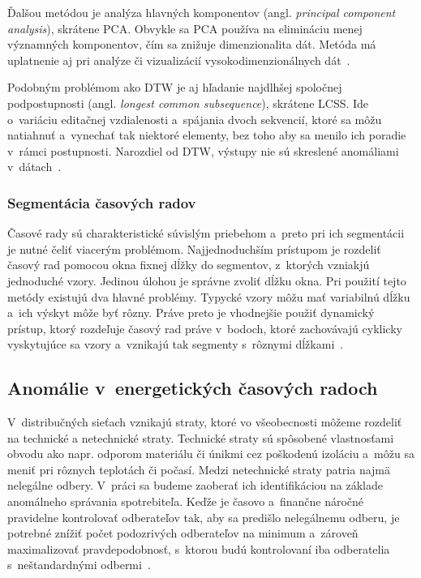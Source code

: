 \documentclass[a4paper,twoside,slovak,12pt,appendix]{article}
\begin{document}
Ďalšou metódou je analýza hlavných komponentov (angl. \textit{principal
component analysis}), skrátene PCA. Obvykle sa PCA používa na elimináciu menej
významných komponentov, čím sa znižuje dimenzionalita dát. Metóda má uplatnenie
aj pri analýze či vizualizácií vysokodimenzionálnych dát~\cite{Fu2011}.

Podobným problémom ako DTW je aj hľadanie najdlhšej spoločnej podpostupnosti
(angl. \textit{longest common subsequence}), skrátene LCSS. Ide o~variáciu
editačnej vzdialenosti a~spájania dvoch sekvencií, ktoré sa môžu natiahnuť
a~vynechať tak niektoré elementy, bez toho aby sa menilo ich poradie v~rámci
postupnosti. Narozdiel od DTW, výstupy nie sú skreslené anomáliami
v~dátach~\cite{Fu2011}.

\subsubsection{Segmentácia časových radov}
Časové rady sú charakteristické súvislým priebehom a~preto pri ich segmentácii
je nutné čeliť viacerým problémom. Najjednoduchším prístupom je rozdeliť časový
rad pomocou okna fixnej dĺžky do segmentov, z~ktorých vzniakjú jednoduché vzory.
Jedinou úlohou je správne zvoliť dĺžku okna. Pri použití tejto metódy existujú
dva hlavné problémy. Typycké vzory môžu mať variabilnú dĺžku a~ich výskyt môže
byť rôzny. Práve preto je vhodnejšie použiť dynamický prístup, ktorý rozdeľuje
časový rad práve v~bodoch, ktoré zachovávajú cyklicky vyskytujúce sa vzory
a~vznikajú tak segmenty s~rôznymi dĺžkami~\cite{Fu2011}.





\subsection{Anomálie v~energetických časových radoch}
V~distribučných sieťach vznikajú straty, ktoré vo všeobecnosti môžeme rozdeliť
na technické a netechnické straty. Technické straty sú spôsobené vlastnosťami
obvodu ako napr. odporom materiálu či únikmi cez poškodenú izoláciu a~môžu sa
meniť pri rôznych teplotách či počasí. Medzi netechnické straty patria najmä
nelegálne odbery. V~práci sa budeme zaoberať ich identifikáciou na základe
anomálneho správania spotrebiteľa. Keďže je časovo a~finančne náročné
pravidelne kontrolovať odberateľov tak, aby sa predišlo nelegálnemu odberu,
je potrebné znížiť počet podozrivých odberateľov na minimum a~zároveň
maximalizovať pravdepodobnosť, s~ktorou budú kontrolovaní iba odberatelia
s~neštandardnými odbermi~\cite{Coma-Puig2016,Sahoo2015}.
\end{document}
